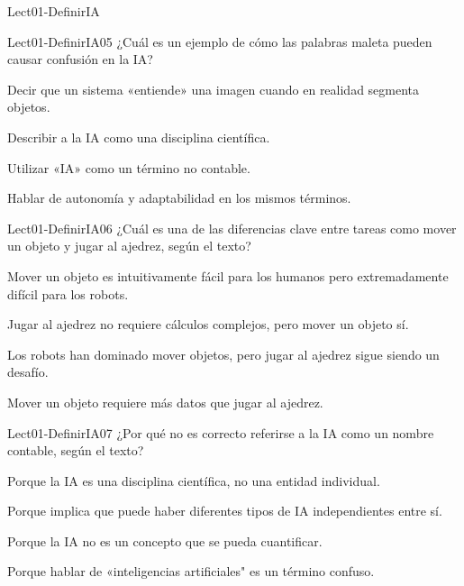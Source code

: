 \documentclass[a4,11pt]{aleph-notas}
\begin{document}
\begin{quiz}{Lect01-DefinirIA}
\begin{multi}[]
{Lect01-DefinirIA05}
¿Cuál es un ejemplo de cómo las palabras maleta pueden causar confusión en la IA?
\item* Decir que un sistema «entiende» una imagen cuando en realidad segmenta objetos.
\item Describir a la IA como una disciplina científica.
\item Utilizar «IA» como un término no contable.
\item Hablar de autonomía y adaptabilidad en los mismos términos.
\end{multi}

\begin{multi}[]
{Lect01-DefinirIA06}
¿Cuál es una de las diferencias clave entre tareas como mover un objeto y jugar al ajedrez, según el texto?
\item* Mover un objeto es intuitivamente fácil para los humanos pero extremadamente difícil para los robots.
\item Jugar al ajedrez no requiere cálculos complejos, pero mover un objeto sí.
\item Los robots han dominado mover objetos, pero jugar al ajedrez sigue siendo un desafío.
\item Mover un objeto requiere más datos que jugar al ajedrez.
\end{multi}

\begin{multi}[]
{Lect01-DefinirIA07}
¿Por qué no es correcto referirse a la IA como un nombre contable, según el texto?
\item* Porque la IA es una disciplina científica, no una entidad individual.
\item Porque implica que puede haber diferentes tipos de IA independientes entre sí.
\item Porque la IA no es un concepto que se pueda cuantificar.
\item Porque hablar de «inteligencias artificiales" es un término confuso.
\end{multi}

\end{quiz}
\end{document}
